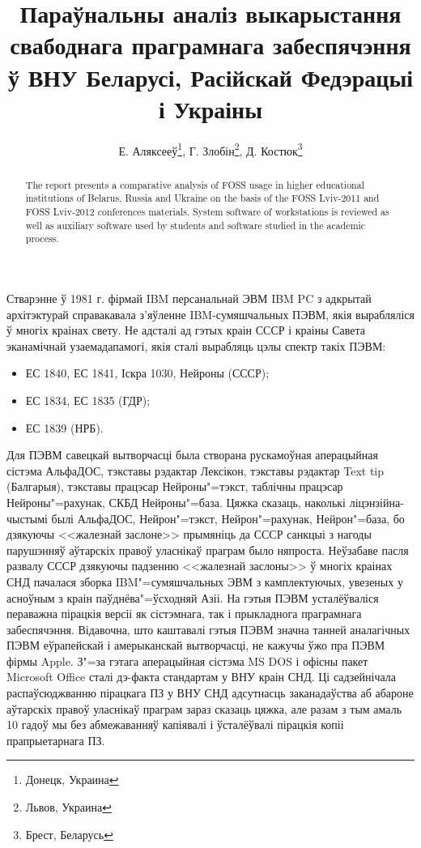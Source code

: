\documentclass[10pt, a5paper]{article}
\begin{document}
\title{Параўнальны аналіз выкарыстання свабоднага праграмнага забеспячэння ў ВНУ Беларусі, Расійскай Федэрацыі і Украіны}%

\author{Е. Аляксееў\footnote{Донецк, Украина}, Г. Злобін\footnote{Львов, Украина}, Д. Костюк\footnote{Брест, Беларусь}}
\maketitle

\begin{abstract}
The report presents a comparative analysis of FOSS usage in higher educational institutions of Belarus, Russia and Ukraine on the basis of the FOSS Lviv-2011 and FOSS Lviv-2012 conferences materials. System software of workstations is reviewed as well as auxiliary software used by students and software studied in the academic process.
\end{abstract}

Стварэнне ў 1981 г. фірмай IBM персанальнай ЭВМ IBM PC з адкрытай архітэктурай справакавала з'яўленне IBM-сумяшчальных ПЭВМ, якія вырабляліся ў многіх краінах свету. Не адсталі ад гэтых краін СССР і краіны Савета эканамічнай узаемадапамогі, якія сталі вырабляць цэлы спектр такіх ПЭВМ:

\begin{itemize}
  \item ЕС 1840, ЕС 1841, Іскра 1030, Нейроны (СССР);
  \item ЕС 1834, ЕС 1835 (ГДР);
  \item ЕС 1839 (НРБ).
\end{itemize}

Для ПЭВМ савецкай вытворчасці была створана рускамоўная аперацыйная сістэма АльфаДОС, тэкставы рэдактар Лексікон, тэкставы рэдактар Text tip (Балгарыя), тэкставы працэсар Нейроны"=тэкст, таблічны працэсар Нейроны"=рахунак, СКБД Нейроны"=база. Цяжка сказаць, наколькі ліцэнзійна-чыстымі былі АльфаДОС, Нейрон"=тэкст, Нейрон"=рахунак, Нейрон"=база, бо дзякуючы <<жалезнай заслоне>> прымяніць да СССР санкцыі з нагоды парушэнняў аўтарскіх правоў уласнікаў праграм было няпроста. Неўзабаве пасля развалу СССР дзякуючы падзенню <<жалезнай заслоны>> ў многіх краінах СНД пачалася зборка IBM"=сумяшчальных ЭВМ з камплектуючых, увезеных у асноўным з краін паўднёва"=ўсходняй Азіі. На гэтыя ПЭВМ усталёўваліся пераважна пірацкія версіі як сістэмнага, так і прыкладнога праграмнага забеспячэння. Відавочна, што каштавалі гэтыя ПЭВМ значна танней аналагічных ПЭВМ еўрапейскай і амерыканскай вытворчасці, не кажучы ўжо пра ПЭВМ фірмы Apple. З"=за гэтага аперацыйная сістэма MS DOS і офісны пакет Microsoft Office сталі дэ-факта стандартам у ВНУ краін СНД. Ці садзейнічала распаўсюджванню пірацкага ПЗ у ВНУ СНД адсутнасць заканадаўства аб абароне аўтарскіх правоў уласнікаў праграм зараз сказаць цяжка, але разам з тым амаль 10 гадоў мы без абмежаванняў капіявалі і ўсталёўвалі пірацкія копіі прапрыетарнага ПЗ.
\end{document}
